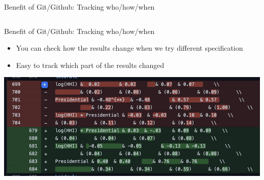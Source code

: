 \documentclass[handout,pdftex,10pt,aspectratio=169]{beamer}
\begin{document}
\begin{frame}{Benefit of Git/Github: Tracking who/how/when}
\begin{columns}
\begin{column}{0.53\linewidth}
  \end{column}
  \end{columns}
\end{frame}

\begin{frame}{Benefit of Git/Github: Tracking who/how/when}
  \begin{itemize}[<+->]\setlength\itemsep{-3pt}
    \item You can check how the results change when we try different specification
    \item Easy to track which part of the results changed
  \end{itemize}
  \vspace{10pt}
  \centering
  \includegraphics[width = 0.7\linewidth]{github_regression.png}
\end{frame}
\end{document}
